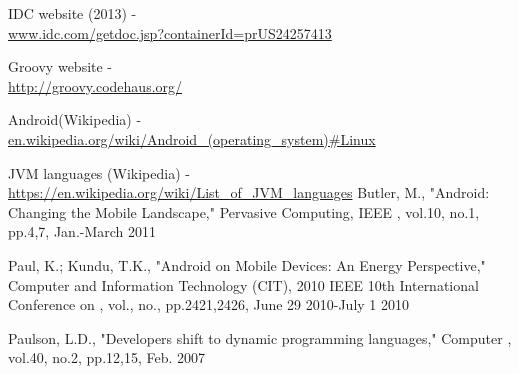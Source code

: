\documentclass{sigplanconf}
\def \ANDROID{\mbox{Android}\xspace}
\def \JVM{JVM\xspace}
\begin{document}
\begin{thebibliography}{}
  \softraggedright

  IDC website (2013) - \\ \url{www.idc.com/getdoc.jsp?containerId=prUS24257413}

  Groovy website - \\ \url{http://groovy.codehaus.org/}
  
  \ANDROID (Wikipedia) - \\ \url{en.wikipedia.org/wiki/Android\_(operating\_system)#Linux}

  \JVM languages (Wikipedia) - \\ \url{https://en.wikipedia.org/wiki/List\_of\_JVM\_languages}
   Butler, M., "Android: Changing the Mobile Landscape," Pervasive Computing, IEEE , vol.10, no.1, pp.4,7, Jan.-March 2011

  Paul, K.; Kundu, T.K., "Android on Mobile Devices: An Energy Perspective," Computer and Information Technology (CIT), 2010 IEEE 10th International Conference on , vol., no., pp.2421,2426, June 29 2010-July 1 2010

  Paulson, L.D., "Developers shift to dynamic programming languages," Computer , vol.40, no.2, pp.12,15, Feb. 2007


\end{thebibliography}
\end{document}
